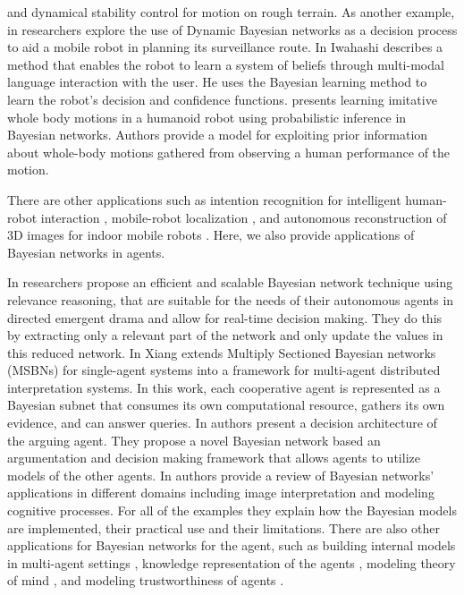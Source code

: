 \documentclass[11pt]{article}
\begin{document}
and dynamical stability control for motion on rough terrain. As another example,
in \cite{chong:bbn-decision-planning} researchers explore the use of Dynamic
Bayesian networks as a decision process to aid a mobile robot in planning its
surveillance route. In \cite{iwahashi:belief-system-hri} Iwahashi describes a
method that enables the robot to learn a system of beliefs through multi-modal
language interaction with the user. He uses the Bayesian learning method to
learn the robot's decision and confidence functions.
\cite{grimes:imitation-robot-bayesian} presents learning imitative whole body
motions in a humanoid robot using probabilistic inference in Bayesian networks.
Authors provide a model for exploiting prior information about whole-body
motions gathered from observing a human performance of the motion. 

There are other applications such as intention recognition for intelligent
human-robot interaction \cite{tahboub:hri-dbn}, mobile-robot localization
\cite{zhou:mobile-robot-localization} \cite{fox:bayesian-location}, and
autonomous reconstruction of 3D images for indoor mobile robots
\cite{delage:dbn-image-reconstruction}. Here, we also provide applications of
Bayesian networks in agents. 

In \cite{arinbjarnar:bn-agent-drama} researchers propose an efficient and
scalable Bayesian network technique using relevance reasoning, that are
suitable for the needs of their autonomous agents in directed emergent drama and
allow for real-time decision making. They do this by extracting only a relevant
part of the network and only update the values in this reduced network. In
\cite{xiang:dai-bn} Xiang extends Multiply Sectioned Bayesian networks (MSBNs)
for single-agent systems into a framework for multi-agent distributed
interpretation systems. In this work, each cooperative agent is represented as a
Bayesian subnet that consumes its own computational resource, gathers its own
evidence, and can answer queries. In \cite{saha:bayes-negotiation} authors
present a decision architecture of the arguing agent. They propose a novel
Bayesian network based an argumentation and decision making framework that
allows agents to utilize models of the other agents. In
\cite{grootswagers:bbn-applications} authors provide a review of Bayesian
networks' applications in different domains including image interpretation and
modeling cognitive processes. For all of the examples they explain how the
Bayesian models are implemented, their practical use and their limitations.
There are also other applications for Bayesian networks for the agent, such as
building internal models in multi-agent settings \cite{nielsen:fusion-bn-mas},
knowledge representation of the agents \cite{bloemeke:agent-encapsulated-bn}
\cite{santos:cognitive-knowledge-representation}
\cite{martin:reasoning-action-bbn}, modeling theory of mind
\cite{baker:bayesian-tom} \cite{bello:cginitive-foundation-tom}, and modeling
trustworthiness of agents \cite{tan:trust-bbn}.\\ \\ \\
\end{document}
